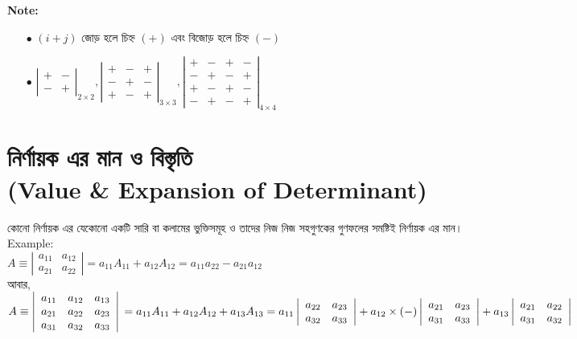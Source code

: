 \begin{itemize}
 	\begin{tcolorbox}
 		\textbf{Note:}
 		\begin{itemize}
 			\item[$\bullet$] $(i+j)$ জোড় হলে চিহ্ন $(+)$ এবং বিজোড় হলে চিহ্ন $(-)$ \\
 			\item[$\bullet$] $\left|\begin{array}{cc}
 				+ & - \\
 				- & +
 			\end{array}\right|_{2\times 2}, \left|\begin{array}{ccc}
 			+ & - & + \\
 			- & + & - \\
 			+ & - & +
 			\end{array}\right|_{3\times 3}, \left|\begin{array}{cccc}
 			+ & - & + & -\\
 			- & + & - & +\\
 			+ & - & + & - \\
 			- & + & - & +
 			\end{array}\right|_{4\times 4} $
 		\end{itemize}
 	\end{tcolorbox}
\end{itemize}

\section{নির্ণায়ক এর মান ও বিস্তৃতি \\(Value \& Expansion of Determinant)}\label{section-7}
কোনো নির্ণায়ক এর যেকোনো একটি সারি বা কলামের ভুক্তিসমূহ ও তাদের নিজ নিজ সহগুণকের গুণফলের সমষ্টিই নির্ণায়ক এর মান। \\
Example:\\
$
A \equiv \left|\begin{array}{cc}
a_{11} & a_{12} \\
a_{21} & a_{22}
\end{array}\right|=a_{11}A_{11}+a_{12}A_{12}=a_{11}a_{22}-a_{21}a_{12}
$
\\আবার,\\ 
$
	A\equiv\left|\begin{array}{ccc}
	a_{11} & a_{12} & a_{13} \\
	a_{21} & a_{22} & a_{23} \\
	a_{31} & a_{32} & a_{33}
	\end{array}\right|\\ \\
	=a_{11}A_{11}+a_{12}A_{12}+a_{13}A_{13}\\ \\
	=a_{11}\left|\begin{array}{cc}
	a_{22} & a_{23} \\
	a_{32} & a_{33}
	\end{array}\right|+a_{12}\times (-)\left|\begin{array}{cc}
	a_{21} & a_{23} \\
	a_{31} & a_{33}
	\end{array}\right|+a_{13}\left|\begin{array}{cc}
	a_{21} & a_{22} \\
	a_{31} & a_{32}
	\end{array}\right|
$
